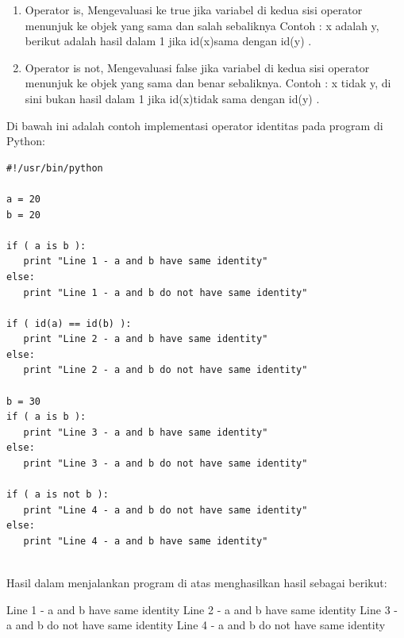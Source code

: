 \begin{enumerate}
\item Operator is, Mengevaluasi ke true jika variabel di kedua sisi operator menunjuk ke objek yang sama dan salah sebaliknya
      Contoh : x adalah y, berikut adalah hasil dalam 1 jika id(x)sama dengan id(y) .

\item Operator is not, Mengevaluasi false jika variabel di kedua sisi operator menunjuk ke objek yang sama dan benar sebaliknya.
      Contoh : x tidak y, di sini bukan hasil dalam 1 jika id(x)tidak sama dengan id(y) .
\end{enumerate}

Di bawah ini adalah contoh implementasi operator identitas pada program di Python:

\begin{verbatim}
#!/usr/bin/python

a = 20
b = 20

if ( a is b ):
   print "Line 1 - a and b have same identity"
else:
   print "Line 1 - a and b do not have same identity"

if ( id(a) == id(b) ):
   print "Line 2 - a and b have same identity"
else:
   print "Line 2 - a and b do not have same identity"

b = 30
if ( a is b ):
   print "Line 3 - a and b have same identity"
else:
   print "Line 3 - a and b do not have same identity"

if ( a is not b ):
   print "Line 4 - a and b do not have same identity"
else:
   print "Line 4 - a and b have same identity"
   
\end{verbatim}

Hasil dalam menjalankan program di atas menghasilkan hasil sebagai berikut: 

Line 1 - a and b have same identity
Line 2 - a and b have same identity
Line 3 - a and b do not have same identity
Line 4 - a and b do not have same identity
